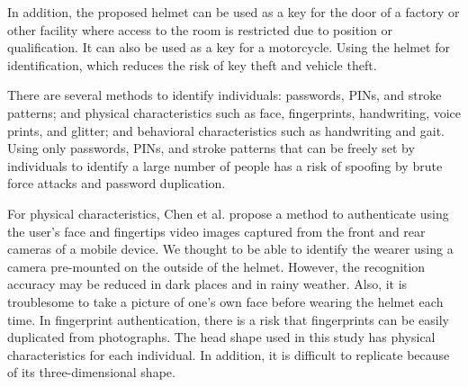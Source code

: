 \documentclass[sigchi,authordraft]{acmart}
\begin{document}

In addition, the proposed helmet can be used as a key for the door of a factory or other facility where access to the room is restricted due to position or qualification. It can also be used as a key for a motorcycle. Using the helmet for identification, which reduces the risk of key theft and vehicle theft.\par


There are several methods to identify individuals: passwords, PINs, and stroke patterns; and physical characteristics such as face, fingerprints, handwriting, voice prints, and glitter; and behavioral characteristics such as handwriting and gait. Using only passwords, PINs, and stroke patterns that can be freely set by individuals to identify a large number of people has a risk of spoofing by brute force attacks and password duplication.\par


For physical characteristics, Chen et al.\cite{face_and_finger} propose a method to authenticate using the user's face and fingertips video images captured from the front and rear cameras of a mobile device. We thought to be able to identify the wearer using a camera pre-mounted on the outside of the helmet. However, the recognition accuracy may be reduced in dark places and in rainy weather. Also, it is troublesome to take a picture of one's own face before wearing the helmet each time. In fingerprint authentication\cite{finger_CNN}, there is a risk that fingerprints can be easily duplicated from photographs. The head shape used in this study has physical characteristics for each individual. In addition, it is difficult to replicate because of its three-dimensional shape.\par
\end{document}
